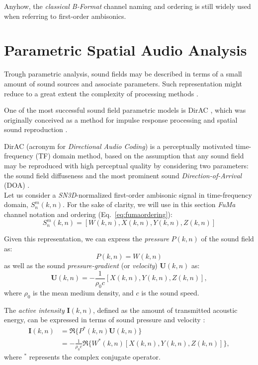 Anyhow, the \textit{classical B-Format} channel naming and ordering is still widely used when referring to first-order ambisonics. 


\section{Parametric Spatial Audio Analysis}

Trough parametric analysis, sound fields may be described in terms of a small amount of sound sources and associate parameters. Such representation might reduce to a great extent the complexity of processing methods \cite{jarrett2017theory}.


One of the most successful sound field parametric models is DirAC \cite{Pulkki07}, which was originally conceived as a method for impulse response processing and spatial sound reproduction \cite{merimaa2005spatial}.


DirAC (acronym for \textit{Directional Audio Coding}) is a perceptually motivated time-frequency (TF) domain method, based on the assumption that any sound field may be reproduced with high perceptual quality by considering two parameters: the sound field diffuseness and the most prominent sound \textit{Direction-of-Arrival} (DOA) \cite{pulkki2018parametric}. \\


\newpage
Let us consider a \textit{SN3D}-normalized first-order ambisonic signal in time-frequency domain, $S_n^m(k, n)$. 
For the sake of clarity, we will use in this section \textit{FuMa} channel notation and ordering (Eq.~\ref{eq:fumaordering}):
\begin{equation}
	S_n^m(k, n) = [W(k, n), X(k, n), Y(k, n), Z(k, n)]
\end{equation}

Given this representation, we can express the \textit{pressure} $P(k,n)$ of the sound field as:
\begin{equation}
	P(k,n) = W(k,n)
\end{equation}
as well as the sound \textit{pressure-gradient} (or \textit{velocity}) $\pmb{U}(k,n)$ as: 
\begin{equation}
	\pmb{U}(k,n) = - \frac{1}{\rho_0 c} [X(k, n), Y(k, n), Z(k, n)], 
\end{equation}
where $\rho_0$ is the mean medium density, and $c$ is the sound speed. 

The \textit{active intensity} $\pmb{I}(k,n)$, defined as the amount of transmitted acoustic energy, can be expressed in terms of sound pressure and velocity \cite{fahy1990sound}:
\begin{equation}
	\begin{aligned}
	\pmb{I}(k,n) &=  \Re\{P^*(k,n)\pmb{U}(k,n)\} \\
	&= - \frac{1}{\rho_0 c}\Re\{W^*(k,n)[X(k,n),Y(k,n),Z(k,n)]\},
	\end{aligned}
\end{equation}
where $^*$ represents the complex conjugate operator. 

